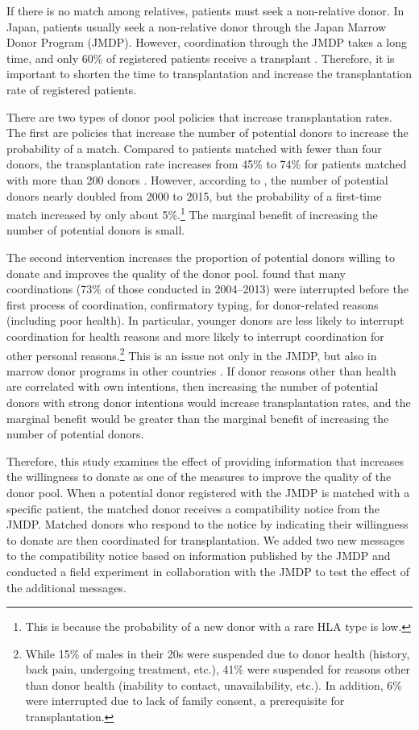 \documentclass[
]{article}
\begin{document}
If there is no match among relatives, patients must seek a non-relative donor. In Japan, patients usually seek a non-relative donor through the Japan Marrow Donor Program (JMDP). However, coordination through the JMDP takes a long time, and only 60\% of registered patients receive a transplant \citep{Hirakawa2018}. Therefore, it is important to shorten the time to transplantation and increase the transplantation rate of registered patients.

There are two types of donor pool policies that increase transplantation rates. The first are policies that increase the number of potential donors to increase the probability of a match. Compared to patients matched with fewer than four donors, the transplantation rate increases from 45\% to 74\% for patients matched with more than 200 donors \citep{Hirakawa2018}. However, according to \citet{Takanashi2016}, the number of potential donors nearly doubled from 2000 to 2015, but the probability of a first-time match increased by only about 5\%.\footnote{This is because the probability of a new donor with a rare HLA type is low.} The marginal benefit of increasing the number of potential donors is small.

The second intervention increases the proportion of potential donors willing to donate and improves the quality of the donor pool. \citet{Hirakawa2018} found that many coordinations (73\% of those conducted in 2004--2013) were interrupted before the first process of coordination, confirmatory typing, for donor-related reasons (including poor health). In particular, younger donors are less likely to interrupt coordination for health reasons and more likely to interrupt coordination for other personal reasons.\footnote{While 15\% of males in their 20s were suspended due to donor health (history, back pain, undergoing treatment, etc.), 41\% were suspended for reasons other than donor health (inability to contact, unavailability, etc.). In addition, 6\% were interrupted due to lack of family consent, a prerequisite for transplantation.} This is an issue not only in the JMDP, but also in marrow donor programs in other countries \citep{Haylock2022}. If donor reasons other than health are correlated with own intentions, then increasing the number of potential donors with strong donor intentions would increase transplantation rates, and the marginal benefit would be greater than the marginal benefit of increasing the number of potential donors.

Therefore, this study examines the effect of providing information that increases the willingness to donate as one of the measures to improve the quality of the donor pool. When a potential donor registered with the JMDP is matched with a specific patient, the matched donor receives a compatibility notice from the JMDP. Matched donors who respond to the notice by indicating their willingness to donate are then coordinated for transplantation. We added two new messages to the compatibility notice based on information published by the JMDP and conducted a field experiment in collaboration with the JMDP to test the effect of the additional messages.
\end{document}
